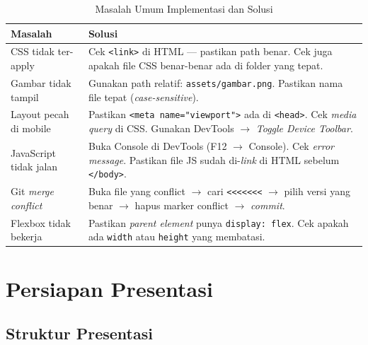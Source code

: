 \begin{table}[htbp]
\centering
\caption{Masalah Umum Implementasi dan Solusi}
\label{tab:troubleshooting-umum}
\small
\begin{tabular}{@{}p{5.5cm}p{8cm}@{}}
\toprule
\textbf{Masalah} & \textbf{Solusi} \\
\midrule
CSS tidak ter-apply & Cek \texttt{<link>} di HTML --- pastikan path benar. Cek juga apakah file CSS benar-benar ada di folder yang tepat. \\
Gambar tidak tampil & Gunakan path relatif: \texttt{assets/gambar.png}. Pastikan nama file tepat (\emph{case-sensitive}). \\
Layout pecah di mobile & Pastikan \texttt{<meta name="viewport">} ada di \texttt{<head>}. Cek \emph{media query} di CSS. Gunakan DevTools $\rightarrow$ \emph{Toggle Device Toolbar}. \\
JavaScript tidak jalan & Buka Console di DevTools (F12 $\rightarrow$ Console). Cek \emph{error message}. Pastikan file JS sudah di-\emph{link} di HTML sebelum \texttt{</body>}. \\
Git \emph{merge conflict} & Buka file yang conflict $\rightarrow$ cari \texttt{<<<<<<<} $\rightarrow$ pilih versi yang benar $\rightarrow$ hapus marker conflict $\rightarrow$ \emph{commit}. \\
Flexbox tidak bekerja & Pastikan \emph{parent element} punya \texttt{display: flex}. Cek apakah ada \texttt{width} atau \texttt{height} yang membatasi. \\
\bottomrule
\end{tabular}
\end{table}

\section{Persiapan Presentasi}
\label{sec:persiapan-presentasi}

\subsection{Struktur Presentasi}
\label{subsec:struktur-presentasi}

